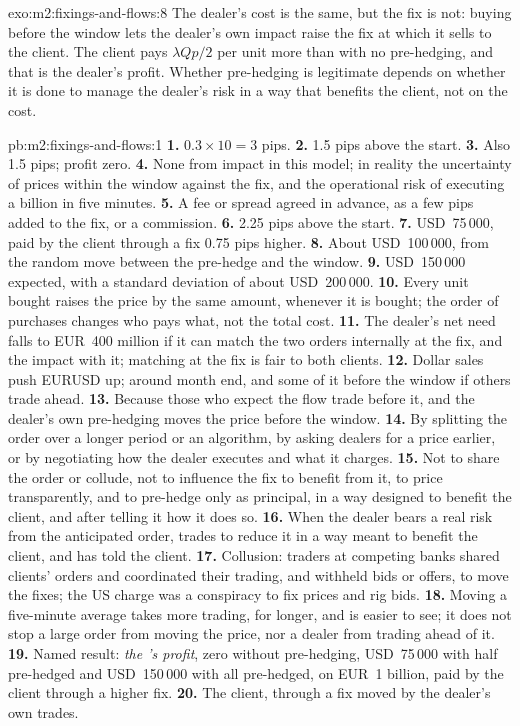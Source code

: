 \begin{solution}{exo:m2:fixings-and-flows:8}
The dealer's cost is the same, but the fix is not: buying before the window lets
the dealer's own impact raise the fix at which it sells to the client. The client
pays $\lambda Q p/2$ per unit more than with no pre-hedging, and that is the
dealer's profit. Whether pre-hedging is legitimate depends on whether it is done
to manage the dealer's risk in a way that benefits the client, not on the cost.
\end{solution}

\begin{solution}{pb:m2:fixings-and-flows:1}
\textbf{1.} $0.3 \times 10 = 3$ pips.
\textbf{2.} 1.5 pips above the start.
\textbf{3.} Also 1.5 pips; profit zero.
\textbf{4.} None from impact in this model; in reality the uncertainty of prices
within the window against the fix, and the operational risk of executing a
billion in five minutes.
\textbf{5.} A fee or spread agreed in advance, as a few pips added to the fix,
or a commission.
\textbf{6.} 2.25 pips above the start.
\textbf{7.} USD~75\,000, paid by the client through a fix 0.75 pips higher.
\textbf{8.} About USD~100\,000, from the random move between the pre-hedge and
the window.
\textbf{9.} USD~150\,000 expected, with a standard deviation of about USD~200\,000.
\textbf{10.} Every unit bought raises the price by the same amount, whenever it is
bought; the order of purchases changes who pays what, not the total cost.
\textbf{11.} The dealer's net need falls to EUR~400 million if it can match the
two orders internally at the fix, and the impact with it; matching at the fix is
fair to both clients.
\textbf{12.} Dollar sales push EURUSD up; around month end, and some of it before
the window if others trade ahead.
\textbf{13.} Because those who expect the flow trade before it, and the dealer's
own pre-hedging moves the price before the window.
\textbf{14.} By splitting the order over a longer period or an algorithm, by
asking dealers for a price earlier, or by negotiating how the dealer executes and
what it charges.
\textbf{15.} Not to share the order or collude, not to influence the fix to
benefit from it, to price transparently, and to pre-hedge only as principal, in a
way designed to benefit the client, and after telling it how it does so.
\textbf{16.} When the dealer bears a real risk from the anticipated order, trades
to reduce it in a way meant to benefit the client, and has told the client.
\textbf{17.} Collusion: traders at competing banks shared clients' orders and
coordinated their trading, and withheld bids or offers, to move the fixes; the
US charge was a conspiracy to fix prices and rig bids.
\textbf{18.} Moving a five-minute average takes more trading, for longer, and is
easier to see; it does not stop a large order from moving the price, nor a dealer
from trading ahead of it.
\textbf{19.} Named result: \emph{the 's profit}, zero without
pre-hedging, USD~75\,000 with half pre-hedged and USD~150\,000 with all
pre-hedged, on EUR~1 billion, paid by the client through a higher fix.
\textbf{20.} The client, through a fix moved by the dealer's own trades.
\end{solution}

